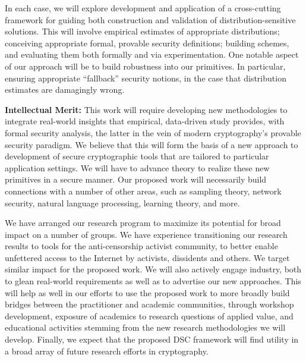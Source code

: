 \smallskip
In each case, we will explore development and application of a cross-cutting 
framework for guiding both construction and validation of distribution-sensitive
solutions. This will involve empirical estimates of appropriate distributions; 
conceiving appropriate formal, provable security definitions; building schemes,
and evaluating them both formally and via experimentation.  One notable aspect of
our approach will be to build robustness into our primitives.  In particular,
ensuring appropriate ``fallback'' security notions, in the case that distribution estimates
are damagingly wrong.   %

\medskip 

\noindent \textbf{Intellectual Merit:} This work will require developing new
methodologies to integrate real-world insights that empirical,
data-driven study provides, with formal security analysis, the latter
in the vein of modern cryptography's provable security paradigm. 
We believe that this will form the basis of a new approach to
development of secure cryptographic tools that are tailored to particular
application settings.  We will have to advance theory to realize these new
primitives in a secure manner. Our proposed work will necessarily build
connections with a number of other areas, such as sampling theory, network
security, natural language processing, learning theory, and more.  

\medskip

  We have arranged our research program to
maximize its potential for broad impact on a number of groups. We have
experience transitioning our research results to tools for the anti-censorship
activist community, to better enable unfettered access to the Internet by
activists, dissidents and others. We target similar impact for the proposed
work. We will also actively engage industry, both to glean real-world requirements
as well as to advertise our new approaches. This will help as well in our efforts
to use the proposed work to more broadly build bridges between the practitioner
and academic communities, through workshop development, exposure of academics to 
research questions of applied value, and educational activities stemming from
the new research methodologies we will develop. Finally, we expect that the
proposed DSC framework will find utility in a broad array
of future research efforts in cryptography.


